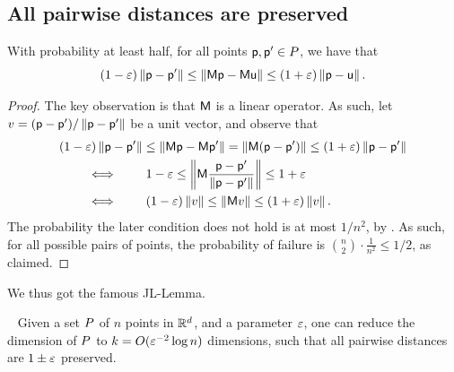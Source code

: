 \subsection{All pairwise distances are preserved}

\begin{lemma}
    With probability at least half, for all points $\mathsf{p}, \mathsf{p}' \in
    P$, we have that
    \begin{equation*}
        (1-\eps) \distY{\pnt}{\pnt'}%
        \leq%
        \distY{ \Matrix \pnt}{\Matrix \pntA }%
        \leq%
        (1+\eps) \distY{\pnt}{\pntA}.%
    \end{equation*}
\end{lemma}
\begin{proof}
    The key observation is that $\mathsf{M}$ is a linear operator. As
    such, let $v = (\mathsf{p} - \mathsf{p}') / \left\| {\mathsf{p} - \mathsf{p}'} \right\|$ be a unit
    vector, and observe that
    \begin{align*}
      &(1-\eps) \distY{\pnt}{\pnt'}%
        \leq%
        \distY{ \Matrix \pnt}{\Matrix \pnt' }%
        =%
        \norm{ \Matrix( \pnt- \pnt') }%
        \leq%
        (1+\eps) \distY{\pnt}{\pnt'}
      \\&%
      \qquad \iff \qquad%
      1-\eps %
      \leq%
        \norm{ \Matrix\frac{ \pnt- \pnt'}{\distY{\pnt}{\pnt'}} }%
        \leq%
      1+\eps
      \\&%
      \qquad \iff \qquad%
      (1-\eps) \norm{v}%
      \leq%
      \norm{ \Matrix v  }%
      \leq%
      (1+\eps) \norm{v}.        
    \end{align*}
    The probability the later condition does not hold is at most
    $1/n^2$, by . As such, for all possible pairs
    of points, the probability of failure is
    $\binom{n}{2} \cdot \frac{1}{n^2} \leq 1/2$, as claimed.
\end{proof}

We thus got the famous J{}L-Lemma.

\begin{theorem}
    ~
    \noindent%
    Given a set $P$ of $n$ points in $\mathbb{R}^d$, and a parameter
    ${\varepsilon}$, one can reduce the dimension of $P$ to
    $k = O({\varepsilon}^{-2} \log n)$ dimensions, such that all pairwise distances
    are $1\pm {\varepsilon}$ preserved.
\end{theorem}

